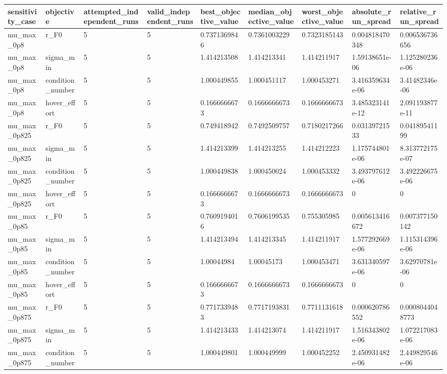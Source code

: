 \begin{tabular}{@{}lllllllll@{}}
\toprule
sensitivity\_case & objective & attempted\_independent\_runs & valid\_independent\_runs & best\_objective\_value & median\_objective\_value & worst\_objective\_value & absolute\_run\_spread & relative\_run\_spread \\
\midrule
mu\_max\_0p8 & r\_F0 & 5 & 5 & 0.7371369846 & 0.7361003229 & 0.7323185143 & 0.004818470348 & 0.006536736656 \\
mu\_max\_0p8 & sigma\_min & 5 & 5 & 1.414213508 & 1.414213341 & 1.414211917 & 1.59138651e-06 & 1.125280236e-06 \\
mu\_max\_0p8 & condition\_number & 5 & 5 & 1.000449855 & 1.000451117 & 1.000453271 & 3.416359634e-06 & 3.41482346e-06 \\
mu\_max\_0p8 & hover\_effort & 5 & 5 & 0.1666666673 & 0.1666666673 & 0.1666666673 & 3.485323141e-12 & 2.091193877e-11 \\
mu\_max\_0p825 & r\_F0 & 5 & 5 & 0.749418942 & 0.7492509757 & 0.7180217266 & 0.03139721533 & 0.04189541199 \\
mu\_max\_0p825 & sigma\_min & 5 & 5 & 1.414213399 & 1.414213255 & 1.414212223 & 1.175744801e-06 & 8.313772175e-07 \\
mu\_max\_0p825 & condition\_number & 5 & 5 & 1.000449838 & 1.000450024 & 1.000453332 & 3.493797612e-06 & 3.492226675e-06 \\
mu\_max\_0p825 & hover\_effort & 5 & 5 & 0.1666666673 & 0.1666666673 & 0.1666666673 & 0 & 0 \\
mu\_max\_0p85 & r\_F0 & 5 & 5 & 0.7609194016 & 0.7606199535 & 0.755305985 & 0.005613416672 & 0.007377150142 \\
mu\_max\_0p85 & sigma\_min & 5 & 5 & 1.414213494 & 1.414213345 & 1.414211917 & 1.577292669e-06 & 1.115314396e-06 \\
mu\_max\_0p85 & condition\_number & 5 & 5 & 1.00044984 & 1.00045173 & 1.000453471 & 3.631340597e-06 & 3.62970781e-06 \\
mu\_max\_0p85 & hover\_effort & 5 & 5 & 0.1666666673 & 0.1666666673 & 0.1666666673 & 0 & 0 \\
mu\_max\_0p875 & r\_F0 & 5 & 5 & 0.7717339483 & 0.7717193831 & 0.7711131618 & 0.000620786552 & 0.0008044048773 \\
mu\_max\_0p875 & sigma\_min & 5 & 5 & 1.414213433 & 1.414213074 & 1.414211917 & 1.516343802e-06 & 1.072217083e-06 \\
mu\_max\_0p875 & condition\_number & 5 & 5 & 1.000449801 & 1.000449999 & 1.000452252 & 2.450931482e-06 & 2.449829546e-06 \\

\end{tabular}
